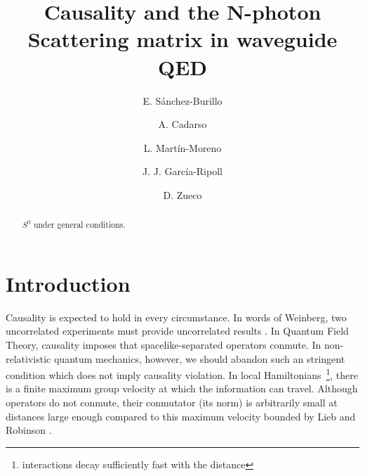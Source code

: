 \documentclass[notitlepage, prx, preprint, amsmath,superscriptaddress,amssymb]{revtex4-1}
\begin{document}
\title{Causality and the N-photon Scattering matrix in waveguide QED}

\author{E. S\'anchez-Burillo}

\author{A. Cadarso}

\author{L. Mart\'in-Moreno}

\author{J. J. Garc\'ia-Ripoll}

\author{D. Zueco}



\begin{abstract}
$S^0$ under general conditions.
\end{abstract}



\maketitle


\section{Introduction}

Causality is  expected to hold in every circumstance.    In words of Weinberg, two uncorrelated experiments must provide uncorrelated results \cite{Weinberg1996}.     In Quantum Field Theory, causality imposes that  spacelike-separated operators conmute.   In non-relativistic quantum mechanics, however, we should abandon such an stringent condition which  does not imply causality violation.  In local Hamiltonians~\footnote{interactions decay sufficiently fast with the distance}, there is a finite maximum  group velocity at which the information can travel.   Although operators do not conmute,  their conmutator  (its norm) is arbitrarily small at distances large enough compared to this maximum velocity  bounded by Lieb and Robinson \cite{Lieb1972}.  
\end{document}
